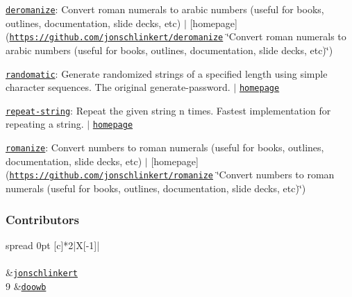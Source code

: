 \begin{DoxyItemize}
\item \href{https://www.npmjs.com/package/deromanize}{\tt deromanize}\+: Convert roman numerals to arabic numbers (useful for books, outlines, documentation, slide decks, etc) $\vert$ \mbox{[}homepage\mbox{]}(\href{https://github.com/jonschlinkert/deromanize}{\tt https\+://github.\+com/jonschlinkert/deromanize} \char`\"{}\+Convert roman numerals to arabic numbers (useful for books, outlines, documentation, slide decks, etc)\char`\"{})
\item \href{https://www.npmjs.com/package/randomatic}{\tt randomatic}\+: Generate randomized strings of a specified length using simple character sequences. The original generate-\/password. $\vert$ \href{https://github.com/jonschlinkert/randomatic}{\tt homepage}
\item \href{https://www.npmjs.com/package/repeat-string}{\tt repeat-\/string}\+: Repeat the given string n times. Fastest implementation for repeating a string. $\vert$ \href{https://github.com/jonschlinkert/repeat-string}{\tt homepage}
\item \href{https://www.npmjs.com/package/romanize}{\tt romanize}\+: Convert numbers to roman numerals (useful for books, outlines, documentation, slide decks, etc) $\vert$ \mbox{[}homepage\mbox{]}(\href{https://github.com/jonschlinkert/romanize}{\tt https\+://github.\+com/jonschlinkert/romanize} \char`\"{}\+Convert numbers to roman numerals (useful for books, outlines, documentation, slide decks, etc)\char`\"{})
\end{DoxyItemize}

\subsubsection*{Contributors}

\tabulinesep=1mm
\begin{longtabu} spread 0pt [c]{*{2}{|X[-1]}|}
\hline
\rowcolor{\tableheadbgcolor}\\
\endfirsthead
\hline
\endfoot
\hline
\rowcolor{\tableheadbgcolor}\\
  &\href{https://github.com/jonschlinkert}{\tt jonschlinkert}   \\
9  &\href{https://github.com/doowb}{\tt doowb}   \\
\end{longtabu}


